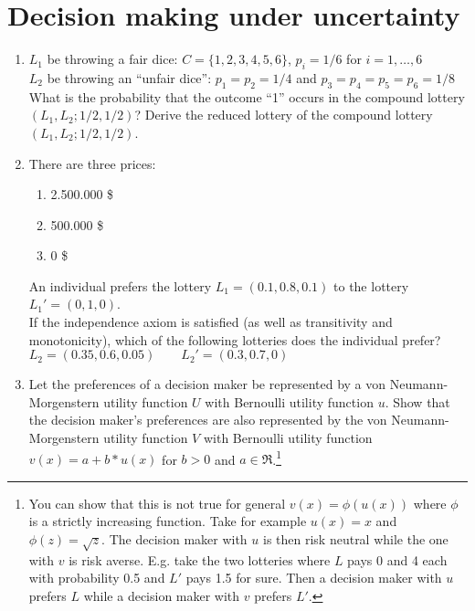 \documentclass[a4paper,12pt]{article}
\begin{document}
\section{Decision making under uncertainty}
\label{sec:decis-making-under}

\begin{enumerate}[resume]
  \item $L_1$ be throwing a fair dice: $C=\{1,2,3,4,5,6\}$, $p_i=1/6$ for $i=1,\dots,6$\\
$L_2$ be throwing an ``unfair dice'': $p_1=p_2=1/4$ and $p_3=p_4=p_5=p_6=1/8$\\
What is the probability that the outcome ``1'' occurs in the compound lottery $(L_1,L_2;1/2,1/2)$? Derive the reduced lottery of the compound lottery $(L_1,L_2;1/2,1/2)$.
 \item  There are three prices:
  \begin{enumerate}
  \item 2.500.000 \$
  \item 500.000 \$
  \item 0 \$
  \end{enumerate}
An individual prefers the lottery $L_1=(0.1,0.8,0.1)$ to the lottery $L_1'=(0,1,0)$.\\
If the independence axiom is satisfied (as well as transitivity and monotonicity), which of the following lotteries does the individual prefer?\\
$L_2=(0.35,0.6,0.05)\qquad L_2'=(0.3,0.7,0)$
  \item Let the preferences of a decision maker be represented by a von Neumann-Morgenstern utility function $U$ with Bernoulli utility function $u$. Show that the decision maker's preferences are also represented by the von Neumann-Morgenstern utility function $V$ with Bernoulli utility function $v(x)=a+b*u(x)$ for $b>0$ and $a\in \Re$.\footnote{You can show that this is not true for general $v(x)=\phi(u(x))$ where $\phi$ is a strictly increasing function. Take for example $u(x)=x$ and $\phi(z)=\sqrt{z}$. The decision maker with $u$ is then risk neutral while the one with $v$ is risk averse. E.g. take the two lotteries where $L$ pays 0 and 4 each with probability 0.5 and $L'$ pays 1.5 for sure. Then a decision maker with $u$ prefers $L$ while a decision maker with $v$ prefers $L'$. }

\end{enumerate}
\end{document}
